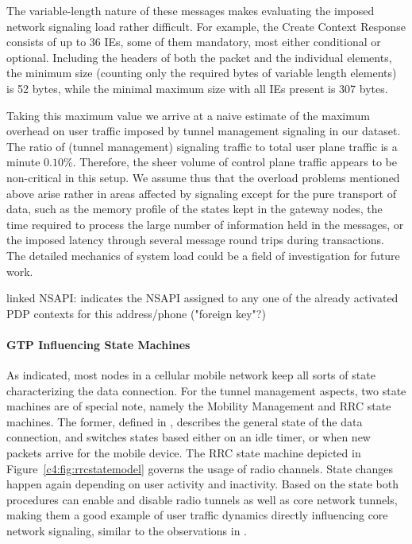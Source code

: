 The variable-length nature of these messages makes evaluating the imposed network signaling load rather difficult. For example, the Create Context Response consists of up to 36 \glspl{IE}, some of them mandatory, most either conditional or optional. Including the headers of both the packet and the individual elements, the minimum size (counting only the required bytes of variable length elements) is 52 bytes, while the minimal maximum size with all \glspl{IE} present is 307 bytes.

Taking this maximum value we arrive at a naive estimate of the maximum overhead on user traffic imposed by tunnel management signaling in our dataset. The ratio of (tunnel management) signaling traffic to total user plane traffic is a minute $0.10\%$. Therefore, the sheer volume of control plane traffic appears to be non-critical in this setup. We assume thus that the overload problems mentioned above arise rather in areas affected by signaling except for the pure transport of data, such as the memory profile of the states kept in the gateway nodes, the time required to process the large number of information held in the messages, or the imposed latency through several message round trips during transactions. The detailed mechanics of system load could be a field of investigation for future work.



linked \gls{NSAPI}: indicates the \gls{NSAPI} assigned to any one of the already activated \gls{PDP} contexts for this address/phone ("foreign key"?)

\paragraph{GTP Influencing State Machines}

As indicated, most nodes in a cellular mobile network keep all sorts of state characterizing the data connection. For the tunnel management aspects, two state machines are of special note, namely the Mobility Management and \gls{RRC} state machines.
The former, defined in \cite{3gpp23.060}, describes the general state of the data connection, and switches states based either on an idle timer, or when new packets arrive for the mobile device. The \gls{RRC} state machine depicted in Figure~\ref{c4:fig:rrcstatemodel} governs the usage of radio channels. State changes happen again depending on user activity and inactivity.
Based on the state both procedures can enable and disable radio tunnels as well as core network tunnels, making them a good example of user traffic dynamics directly influencing core network signaling, similar to the observations in \cite{lee2007detection}.

